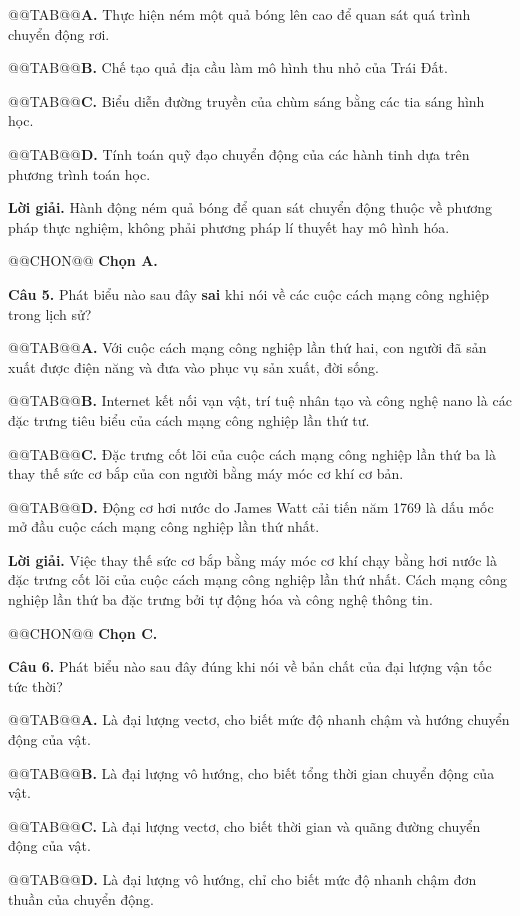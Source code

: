 \documentclass{article}
\begin{document}
@@TAB@@\textbf{A.} Thực hiện ném một quả bóng lên cao để quan sát quá trình chuyển động rơi.

@@TAB@@\textbf{B.} Chế tạo quả địa cầu làm mô hình thu nhỏ của Trái Đất.

@@TAB@@\textbf{C.} Biểu diễn đường truyền của chùm sáng bằng các tia sáng hình học.

@@TAB@@\textbf{D.} Tính toán quỹ đạo chuyển động của các hành tinh dựa trên phương trình toán học.

\textbf{Lời giải.} Hành động ném quả bóng để quan sát chuyển động thuộc về phương pháp thực nghiệm, không phải phương pháp lí thuyết hay mô hình hóa.

@@CHON@@ \textbf{Chọn A.}

\textbf{Câu 5.} Phát biểu nào sau đây \textbf{sai} khi nói về các cuộc cách mạng công nghiệp trong lịch sử?

@@TAB@@\textbf{A.} Với cuộc cách mạng công nghiệp lần thứ hai, con người đã sản xuất được điện năng và đưa vào phục vụ sản xuất, đời sống.

@@TAB@@\textbf{B.} Internet kết nối vạn vật, trí tuệ nhân tạo và công nghệ nano là các đặc trưng tiêu biểu của cách mạng công nghiệp lần thứ tư.

@@TAB@@\textbf{C.} Đặc trưng cốt lõi của cuộc cách mạng công nghiệp lần thứ ba là thay thế sức cơ bắp của con người bằng máy móc cơ khí cơ bản.

@@TAB@@\textbf{D.} Động cơ hơi nước do James Watt cải tiến năm 1769 là dấu mốc mở đầu cuộc cách mạng công nghiệp lần thứ nhất.

\textbf{Lời giải.} Việc thay thế sức cơ bắp bằng máy móc cơ khí chạy bằng hơi nước là đặc trưng cốt lõi của cuộc cách mạng công nghiệp lần thứ nhất. Cách mạng công nghiệp lần thứ ba đặc trưng bởi tự động hóa và công nghệ thông tin.

@@CHON@@ \textbf{Chọn C.}

\textbf{Câu 6.} Phát biểu nào sau đây đúng khi nói về bản chất của đại lượng vận tốc tức thời?

@@TAB@@\textbf{A.} Là đại lượng vectơ, cho biết mức độ nhanh chậm và hướng chuyển động của vật.

@@TAB@@\textbf{B.} Là đại lượng vô hướng, cho biết tổng thời gian chuyển động của vật.

@@TAB@@\textbf{C.} Là đại lượng vectơ, cho biết thời gian và quãng đường chuyển động của vật.

@@TAB@@\textbf{D.} Là đại lượng vô hướng, chỉ cho biết mức độ nhanh chậm đơn thuần của chuyển động.
\end{document}
